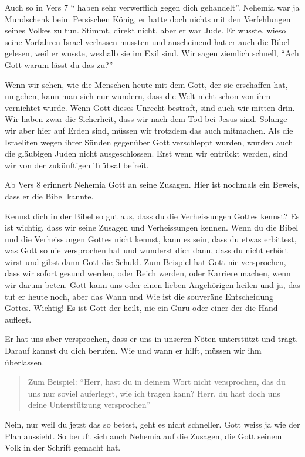 \documentclass[fontsize=16pt]{mybib}
\begin{document}
Auch so in Vers 7 \enquote{ haben sehr verwerflich gegen dich gehandelt}. Nehemia war ja Mundschenk beim Persischen König, er hatte doch nichts mit den Verfehlungen seines Volkes zu tun. Stimmt, direkt nicht, aber er war Jude. Er wusste, wieso seine Vorfahren Israel verlassen mussten und anscheinend hat er auch die Bibel gelesen, weil er wusste, weshalb sie im Exil sind. Wir sagen ziemlich schnell, \enquote{Ach Gott warum lässt du das zu?}

Wenn wir sehen, wie die Menschen heute mit dem Gott, der sie erschaffen hat, umgehen, kann man sich nur wundern, dass die Welt nicht schon von ihm vernichtet wurde. Wenn Gott dieses Unrecht bestraft, sind auch wir mitten drin. Wir haben zwar die Sicherheit, dass wir nach dem Tod bei Jesus sind. Solange wir aber hier auf Erden sind, müssen wir trotzdem das auch mitmachen. Als die Israeliten wegen ihrer Sünden gegenüber Gott verschleppt wurden, wurden auch die gläubigen Juden nicht ausgeschlossen. Erst wenn wir entrückt werden, sind wir von der zukünftigen Trübsal befreit.


Ab Vers 8 erinnert Nehemia Gott an seine Zusagen. Hier ist nochmals ein Beweis, dass er die Bibel kannte.

Kennst  dich in der Bibel so gut aus, dass du die Verheissungen Gottes kennst? Es ist wichtig, dass wir seine Zusagen und Verheissungen kennen. Wenn du die Bibel und die Verheissungen Gottes nicht kennst, kann es sein, dass du etwas erbittest, was Gott so nie versprochen hat und wunderst dich dann, dass du nicht erhört wirst und gibst dann Gott die Schuld. Zum Beispiel hat Gott nie versprochen, dass wir sofort gesund werden, oder Reich werden, oder Karriere machen, wenn wir darum beten. Gott kann uns oder einen lieben Angehörigen heilen und ja, das tut er heute noch, aber das Wann und Wie ist die souveräne Entscheidung Gottes. Wichtig! Es ist  Gott der heilt, nie ein Guru oder einer der die Hand auflegt.

Er hat uns aber versprochen, dass er uns in unseren Nöten unterstützt und trägt. Darauf kannst du dich berufen. Wie und wann er hilft, müssen wir ihm überlassen. 
\begin{quote}
    Zum Beispiel: \enquote{Herr, hast du in deinem Wort nicht versprochen, das du uns nur soviel auferlegst, wie ich tragen kann? Herr, du hast doch uns deine Unterstützung versprochen}     
\end{quote}
Nein, nur weil du jetzt das so betest, geht es nicht schneller. Gott weiss ja wie der Plan aussieht. So beruft sich auch Nehemia auf die Zusagen, die Gott seinem Volk in der Schrift gemacht hat.
\end{document}
